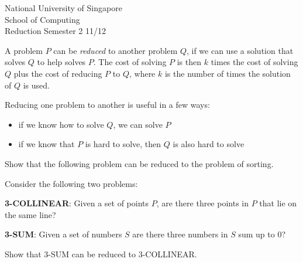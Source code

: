 \documentclass[answers,a4paper,11pt]{exam}
\begin{document}
\extraheadheight{.5in}
%
{\large\sf National University of Singapore\\ School of Computing \\
\LARGE\sf Reduction}%
{\large\sf Semester 2 11/12}
\firstpageheadrule
\pagestyle{headandfoot}

\begin{questions}
\question
A problem $P$ can be \textit{reduced} to another problem $Q$, if we can use a solution that solves $Q$ to help solves $P$.  The cost of solving $P$ is then $k$ times the cost of solving $Q$ plus the cost of reducing $P$ to $Q$, where $k$ is the number of times the solution of $Q$ is used.

Reducing one problem to another is useful in a few ways:
\begin{itemize}
		\item if we know how to solve $Q$, we can solve $P$
		\item if we know that $P$ is hard to solve, then $Q$ is also hard to solve
\end{itemize}

\newpage
\question
Show that the following problem can be reduced to the problem of sorting.

\newpage
\question
Consider the following two problems: 

\textbf{3-COLLINEAR}: Given a set of points $P$,  are there three points in $P$ that lie on the same line?

\textbf{3-SUM}: Given a set of numbers $S$  are there three numbers in $S$ sum up to 0?

Show that 3-SUM can be reduced to 3-COLLINEAR.


\end{questions}
\end{document}
